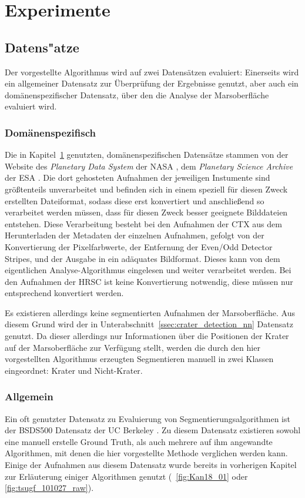 \chapter{Experimente}
\label{chap:experiments}

\section{Datens"atze}
\label{sec:datasets}

Der vorgestellte Algorithmus wird auf zwei Datensätzen evaluiert: Einerseits wird ein allgemeiner Datensatz zur Überprüfung der Ergebnisse genutzt, aber auch ein domänenspezifischer Datensatz, über den die Analyse der Marsoberfläche evaluiert wird. 

\subsection{Domänenspezifisch}

Die in Kapitel~\ref{chap:experiments} genutzten, domänenspezifischen Datensätze stammen von der Website des \textit{Planetary Data System} der NASA \cite{pds}, \bzw dem \textit{Planetary Science Archive} der ESA \cite{psa}. Die dort gehosteten Aufnahmen der jeweiligen Instumente sind größtenteils unverarbeitet und befinden sich in einem speziell für diesen Zweck erstellten Dateiformat, sodass diese erst konvertiert und anschließend so verarbeitet werden müssen, dass für diesen Zweck besser geeignete Bilddateien entstehen.
Diese Verarbeitung besteht bei den Aufnahmen der CTX aus dem Herunterladen der Metadaten der einzelnen Aufnahmen, gefolgt von der Konvertierung der Pixelfarbwerte, der Entfernung der Even/Odd Detector Stripes, und der Ausgabe in ein adäquates Bildformat. Dieses kann von dem eigentlichen Analyse-Algorithmus eingelesen und weiter verarbeitet werden. Bei den Aufnahmen der HRSC ist keine Konvertierung notwendig, diese müssen nur entsprechend konvertiert werden.

Es existieren allerdings keine segmentierten Aufnahmen der Marsoberfläche. Aus diesem Grund wird der in Unterabschnitt~\ref{ssec:crater_detection_nn} Datensatz genutzt. Da dieser allerdings nur Informationen über die Positionen der Krater auf der Marsoberfläche zur Verfügung stellt, werden die durch den hier vorgestellten Algorithmus erzeugten Segmentieren manuell in zwei Klassen eingeordnet: Krater und Nicht-Krater.

\subsection{Allgemein}
\label{ssec:bsds500}
Ein oft genutzter Datensatz zu Evaluierung von Segmentierungsalgorithmen ist der BSDS500 Datensatz der UC Berkeley \cite{bsd500}. Zu diesem Datensatz existieren sowohl eine manuell erstelle Ground Truth, als auch mehrere auf ihm angewandte Algorithmen, mit denen die hier vorgestellte Methode verglichen werden kann.
Einige der Aufnahmen aus diesem Datensatz wurde bereits in vorherigen Kapitel zur Erläuterung einiger Algorithmen genutzt (\vgl \bspw \figurename~\ref{fig:Kan18_01} oder \ref{fig:tsugf_101027_raw}).

